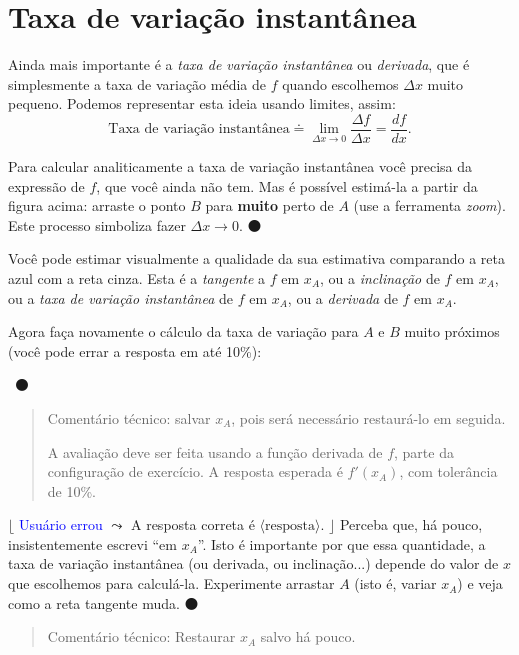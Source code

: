 \documentclass[fleqn,12pt]{scrartcl}
\newenvironment{ct}{\begin{quotation}\color{red!30!black}\sffamily\small Comentário técnico:}{\end{quotation}} %
\newcommand\foreign[1]{\textsl{#1}}
\newcommand\proceed{\textcolor{green!50!black}{$\medbullet$}\xspace}
\newcommand\condicional[2]{$\lfloor$%
	\textsf{\textcolor{blue}{{\footnotesize #1}}}
	$\leadsto$ #2%
	$\rfloor$}
\newcommand\parametro[1]{\ensuremath{\langle\text{#1}\rangle}}
\newcommand\answerfield{\framebox[3cm]{\phantom{A}}~\proceed}
\begin{document}
    \section{Taxa de variação instantânea}

    Ainda mais importante é a \emph{taxa de variação instantânea} ou \emph{derivada}, que é simplesmente a taxa de variação média de $f$ quando escolhemos $\Delta x$ muito pequeno. Podemos representar esta ideia usando limites, assim:
    \begin{equation*}
	\text{Taxa de variação instantânea} \doteq \lim_{\Delta x \to 0} \frac{\Delta f}{\Delta x} = \frac{df}{dx}.
    \end{equation*}
    
    Para calcular analiticamente a taxa de variação instantânea você precisa da expressão de $f$, que você ainda não tem. Mas é possível estimá-la a partir da figura acima: arraste o ponto $B$ para \textbf{muito} perto de $A$ (use a ferramenta \foreign{zoom}). Este processo simboliza fazer $\Delta x \to 0$. \proceed

    Você pode estimar visualmente a qualidade da sua estimativa comparando a reta azul com a reta cinza. Esta é a \emph{tangente} a $f$ em $x_A$, ou a \emph{inclinação} de $f$ em $x_A$, ou a \emph{taxa de variação instantânea} de $f$ em $x_A$, ou a \emph{derivada} de $f$ em $x_A$.

    Agora faça novamente o cálculo da taxa de variação para $A$ e $B$ muito próximos (você pode errar a resposta em até 10\%):

    \answerfield

    \begin{ct}
	salvar $x_A$, pois será necessário restaurá-lo em seguida.

	A avaliação deve ser feita usando a função derivada de $f$, parte da configuração de exercício. A resposta esperada é $f'(x_A)$, com tolerância de 10\%.
    \end{ct}

    \condicional{Usuário errou}{A resposta correta é \parametro{resposta}.} Perceba que, há pouco, insistentemente escrevi ``em $x_A$''. Isto é importante por que essa quantidade, a taxa de variação instantânea (ou derivada, ou inclinação...) depende do valor de $x$ que escolhemos para calculá-la. Experimente arrastar $A$ (isto é, variar $x_A$) e veja como a reta tangente muda. \proceed

    \begin{ct}
	Restaurar $x_A$ salvo há pouco.
    \end{ct}
\end{document}
